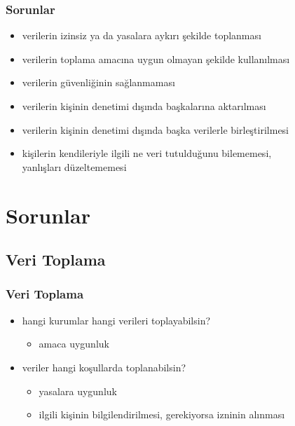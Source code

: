 \documentclass[dvipsnames]{beamer}
\theoremstyle{definition}
\theoremstyle{example}
\theoremstyle{plain}
\begin{document}
\begin{frame}
  \frametitle{Sorunlar}

  \begin{itemize}
    \item verilerin izinsiz ya da yasalara aykırı şekilde toplanması
    \item verilerin toplama amacına uygun olmayan şekilde kullanılması
    \item verilerin güvenliğinin sağlanmaması
    \item verilerin kişinin denetimi dışında başkalarına aktarılması
    \item verilerin kişinin denetimi dışında başka verilerle birleştirilmesi
    \item kişilerin kendileriyle ilgili ne veri tutulduğunu bilememesi,\\
      yanlışları düzeltememesi
  \end{itemize}
\end{frame}

\section{Sorunlar}

\subsection{Veri Toplama}

\begin{frame}
  \frametitle{Veri Toplama}

  \begin{itemize}
    \item hangi kurumlar hangi verileri toplayabilsin?
    \begin{itemize}
      \item amaca uygunluk
    \end{itemize}

    \pause
    \medskip
    \item veriler hangi koşullarda toplanabilsin?
    \begin{itemize}
      \item yasalara uygunluk
      \item ilgili kişinin bilgilendirilmesi, gerekiyorsa izninin alınması
    \end{itemize}
  \end{itemize}
\end{frame}
\end{document}
